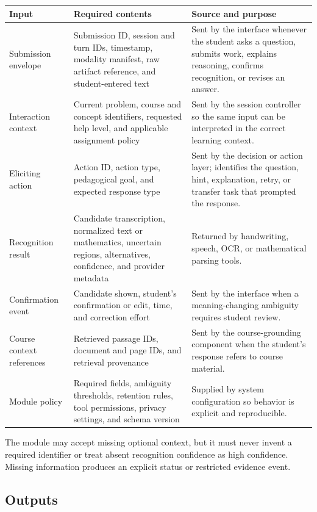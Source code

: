 \documentclass[11pt]{article}
\begin{document}
\noindent\begin{tabularx}{\textwidth}{@{}p{}p{}X@{}}
\toprule
\textbf{Input} & \textbf{Required contents} & \textbf{Source and purpose} \\
\midrule
Submission envelope & Submission ID, session and turn IDs, timestamp, modality manifest, raw artifact reference, and student-entered text & Sent by the interface whenever the student asks a question, submits work, explains reasoning, confirms recognition, or revises an answer. \\
Interaction context & Current problem, course and concept identifiers, requested help level, and applicable assignment policy & Sent by the session controller so the same input can be interpreted in the correct learning context. \\
Eliciting action & Action ID, action type, pedagogical goal, and expected response type & Sent by the decision or action layer; identifies the question, hint, explanation, retry, or transfer task that prompted the response. \\
Recognition result & Candidate transcription, normalized text or mathematics, uncertain regions, alternatives, confidence, and provider metadata & Returned by handwriting, speech, OCR, or mathematical parsing tools. \\
Confirmation event & Candidate shown, student's confirmation or edit, time, and correction effort & Sent by the interface when a meaning-changing ambiguity requires student review. \\
Course context references & Retrieved passage IDs, document and page IDs, and retrieval provenance & Sent by the course-grounding component when the student's response refers to course material. \\
Module policy & Required fields, ambiguity thresholds, retention rules, tool permissions, privacy settings, and schema version & Supplied by system configuration so behavior is explicit and reproducible. \\
\bottomrule
\end{tabularx}

The module may accept missing optional context, but it must never invent a required identifier or treat absent recognition confidence as high confidence. Missing information produces an explicit status or restricted evidence event.

\subsection{Outputs}
\end{document}

